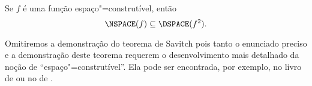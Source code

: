 \begin{utheorem}
    Se $f$ é uma função espaço"=construtível, então
    \begin{equation*}
        \NSPACE(f) \subseteq \DSPACE(f^2).
    \end{equation*}
\end{utheorem}

Omitiremos a demonstração do teorema de Savitch
pois tanto o enunciado preciso e a demonstração deste teorema
requerem o desenvolvimento mais detalhado da noção de
``espaço"=construtível''.
Ela pode ser encontrada, por exemplo,
no livro de 
ou no de .
